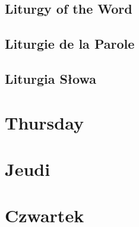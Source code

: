 \newpage
\section[Liturgy of the Word]{Liturgy of the Word}
\begin{english}







\end{english}

\newpage
\section[Liturgie de la Parole]{Liturgie de la Parole}
\begin{french}







\end{french}

\newpage
\section[Liturgia Słowa]{Liturgia Słowa}
\begin{polish}







\end{polish}

\chapter[Thursday * Jeudi * Czwartek][Jeudi]{Thursday\\\myrulev\\Jeudi\\\myrulev\\Czwartek}
